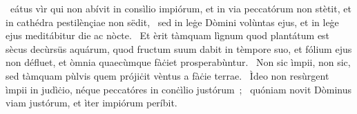 {%
~eátus vìr qui non abívit in consìlio impiórum, et in via peccatórum non stètit, et in cathédra pestilènçiae non sëdit,
~sed in leġe Dòmini volùntas ejus, et in leġe ejus meditábitur die ac nòcte.
~Et èrit tàmquam lìgnum quod plantátum est sècus decùrsüs aquárum, quod fructum suum dabit in tèmpore suo, et fólium ejus non défluet, et òmnia quaecùmque fàċiet prosperabùntur.
~Non sic ìmpii, non sic, sed tàmquam pùlvis quem prójiċit vèntus a fàċie terrae.
~Ìdeo non resùrgent ìmpii in judìċio, néque peccatóres in conċìlio justórum~;
~quóniam novit Dòminus viam justórum, et ìter impiórum períbit.
}
